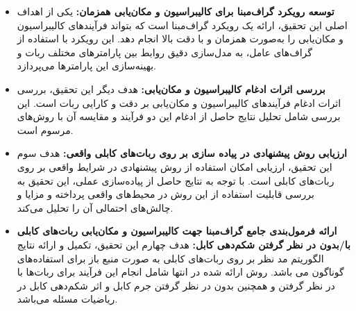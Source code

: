 \begin{itemize}
	\item \textbf{توسعه رویکرد گراف‌مبنا برای کالیبراسیون و مکان‌یابی همزمان:} یکی از اهداف اصلی این تحقیق، ارائه یک رویکرد گراف‌مبنا است که بتواند فرآیندهای کالیبراسیون و مکان‌یابی را به‌صورت همزمان و با دقت بالا انجام دهد. این رویکرد با استفاده از گراف‌های عامل، به مدل‌سازی دقیق روابط بین پارامترهای مختلف ربات و بهینه‌سازی این پارامترها می‌پردازد.
	
	\item \textbf{بررسی اثرات ادغام کالیبراسیون و مکان‌یابی:} هدف دیگر این تحقیق، بررسی اثرات ادغام فرآیندهای کالیبراسیون و مکان‌یابی بر دقت و کارایی ربات است. این بررسی شامل تحلیل نتایج حاصل از ادغام این دو فرآیند و مقایسه آن با روش‌های مرسوم است.
	
	\item \textbf{ارزیابی روش پیشنهادی در پیاده سازی بر روی ربات‌های کابلی واقعی:} هدف سوم این تحقیق، ارزیابی امکان استفاده از روش پیشنهادی در شرایط واقعی بر  روی ربات‌های کابلی است. با توجه به نتایج حاصل از پیاده‌سازی عملی، این تحقیق به بررسی قابلیت استفاده از این روش در محیط‌های واقعی پرداخته و مزایا و چالش‌های احتمالی آن را تحلیل می‌کند.
	
	\item \textbf{ارائه فرمول‌بندی جامع  گراف‌مبنا جهت کالیبراسیون و مکان‌یابی ربات‌های کابلی با/بدون در نظر گرفتن شکم‌دهی کابل:} هدف چهارم این تحقیق، تکمیل و ارائه نتایج الگوریتم مد نظر بر روی ربات‌های کابلی به صورت منبع باز برای استفاده‌های گوناگون می ‌باشد. روش ارائه شده در انتها شامل انجام این فرآیند برای ربات‌ها با در نظر گرفتن و همچنین بدون در نظر گرفتن جرم کابل و اثر شکم‌دهی کابل در ریاضیات مسئله می‌باشد.
	
\end{itemize}


